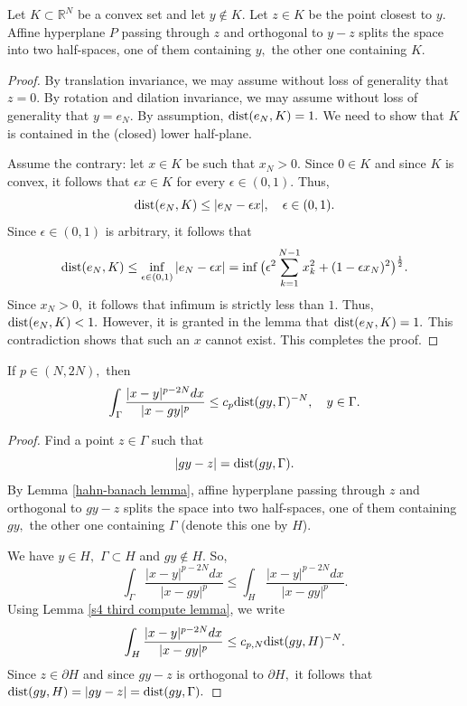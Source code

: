\documentclass{amsart}
\numberwithin{equation}{section}
\begin{document}
\begin{lemma}\label{hahn-banach lemma} Let $K\subset\mathbb{R}^N$ be a convex set and let $y\notin K.$ Let $z\in K$ be the point closest to $y.$ Affine hyperplane $P$ passing through $z$ and orthogonal to $y-z$ splits the space into two half-spaces, one of them containing $y,$ the other one containing $K.$
\end{lemma}
\begin{proof} By translation invariance, we may assume without loss of generality that $z=0.$ By rotation and dilation invariance, we may assume without loss of generality that $y=e_N.$ By assumption, ${\rm dist}(e_N,K)=1.$ We need to show that $K$ is contained in the (closed) lower half-plane.

Assume the contrary: let $x\in K$ be such that $x_N>0.$ Since $0\in K$ and since $K$ is convex, it follows that $\epsilon x\in K$ for every $\epsilon\in(0,1).$ Thus,
$${\rm dist}(e_N,K)\leq |e_N-\epsilon x|,\quad \epsilon\in(0,1).$$
Since $\epsilon\in(0,1)$ is arbitrary, it follows that
$${\rm dist}(e_N,K)\leq \inf_{\epsilon\in(0,1)}|e_N-\epsilon x|=\inf\big(\epsilon^2\sum_{k=1}^{N-1}x_k^2+(1-\epsilon x_N)^2\big)^{\frac12}.$$
Since $x_N>0,$ it follows that infimum is strictly less than $1.$ Thus, ${\rm dist}(e_N,K)<1.$ However, it is granted in the lemma that ${\rm dist}(e_N,K)=1.$ This contradiction shows that such an $x$ cannot exist. This completes the proof.
\end{proof}


\begin{lemma}\label{s4 main lemma} If $p\in(N,2N),$ then
$$\int_{\Gamma}\frac{|x-y|^{p-2N}dx}{|x-gy|^p}\leq c_p{\rm dist}(gy,\Gamma)^{-N},\quad y\in\Gamma.$$
\end{lemma}
\begin{proof} Find a point $z\in\Gamma$ such that
$$|gy-z|={\rm dist}(gy,\Gamma).$$
By Lemma \ref{hahn-banach lemma}, affine hyperplane passing through $z$ and orthogonal to $gy-z$ splits the space into two half-spaces, one of them containing $gy,$ the other one containing $\Gamma$ (denote this one by $H$).

We have $y\in H,$ $\Gamma\subset H$ and $gy\notin H.$ So,
$$\int_{\Gamma}\frac{|x-y|^{p-2N}dx}{|x-gy|^p}\leq\int_H\frac{|x-y|^{p-2N}dx}{|x-gy|^p}.$$
Using Lemma \ref{s4 third compute lemma}, we write
$$\int_H\frac{|x-y|^{p-2N}dx}{|x-gy|^p}\leq c_{p,N}{\rm dist}(gy,H)^{-N}.$$
Since $z\in \partial H$ and since $gy-z$ is orthogonal to $\partial H,$ it follows that ${\rm dist}(gy,H)=|gy-z|={\rm dist}(gy,\Gamma).$
\end{proof}
\end{document}
